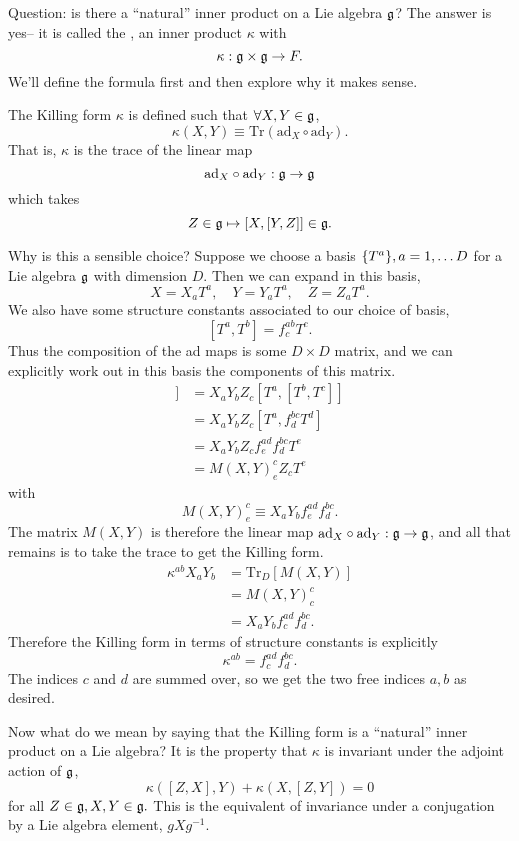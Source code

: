 Question: is there a ``natural'' inner product on a Lie algebra $\mathfrak{g}$? The answer is yes-- it is called the , an inner product $\kappa$ with
$$\kappa:\mathfrak{g} \times \mathfrak{g} \to F.$$
We'll define the formula first and then explore why it makes sense.
\begin{defn}
The Killing form $\kappa$ is defined such that $\forall X,Y \in \mathfrak{g}$,
$$\kappa(X,Y)\equiv \text{Tr}(\text{ad}_X \circ \text{ad}_Y).$$
That is, $\kappa$ is the trace of the linear map
$$\text{ad}_X \circ \text{ad}_Y: \mathfrak{g} \to \mathfrak{g}$$
which takes
$$Z\in \mathfrak{g} \mapsto [X,[Y,Z]] \in \mathfrak{g}.$$
\end{defn}
Why is this a sensible choice? Suppose we choose a basis $\{T^a\},a=1,\ldots D$ for a Lie algebra $\mathfrak{g}$ with dimension $D$. Then we can expand in this basis,
$$X=X_a T^a, \quad Y=Y_a T^a, \quad Z=Z_a T^a.$$
We also have some structure constants associated to our choice of basis,
$$[T^a,T^b]=f^{ab}_c T^c.$$
Thus the composition of the ad maps is some $D\times D$ matrix, and we can explicitly work out in this basis the components of this matrix.
\begin{align*}
[X,[Y,Z]]&= X_a Y_b Z_c [T^a,[T^b,T^c]]\\
&= X_a Y_b Z_c [T^a,f^{bc}_d T^d]\\
&= X_a Y_b Z_c f^{ad}_e f^{bc}_d T^e\\
&= M(X,Y)^c_e Z_c T^e
\end{align*}
with 
$$M(X,Y)^c_e \equiv X_a Y_b f^{ad}_e f^{bc}_d.$$
The matrix $M(X,Y)$ is therefore the linear map $\text{ad}_X\circ \text{ad}_Y:\mathfrak{g} \to \mathfrak{g}$, and all that remains is to take the trace to get the Killing form.
\begin{align*}
\kappa^{ab}X_a Y_b &= \text{Tr}_D[M(X,Y)]\\
&= M(X,Y)^c_c\\
&= X_a Y_b f^{ad}_c f^{bc}_d.
\end{align*}
Therefore the Killing form in terms of structure constants is explicitly
$$\kappa^{ab}=f^{ad}_c f^{bc}_d.$$
The indices $c$ and $d$ are summed over, so we get the two free indices $a,b$ as desired.

Now what do we mean by saying that the Killing form is a ``natural'' inner product on a Lie algebra? It is the property that $\kappa$ is invariant under the adjoint action of $\mathfrak{g}$,
$$\kappa([Z,X],Y)+\kappa(X,[Z,Y])=0$$ for all $Z\in \mathfrak{g}, X,Y \in \mathfrak{g}.$ This is the equivalent of invariance under a conjugation by a Lie algebra element, $g X g^{-1}.$

